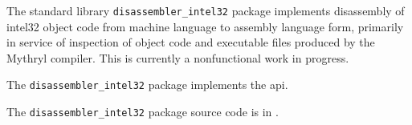 
The standard library {\tt disassembler\_intel32} package implements disassembly of intel32 object code 
from machine language to assembly language form, primarily in service of inspection of object 
code and executable files produced by the Mythryl compiler.  This is currently a nonfunctional 
work in progress.

The {\tt disassembler\_intel32} package implements the  api.

The {\tt disassembler\_intel32} package source code is in .

